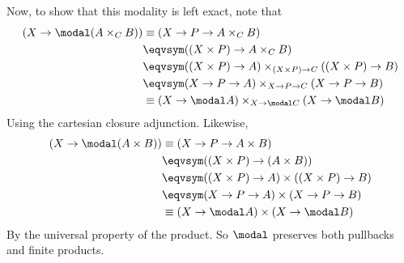 Now, to show that this modality is left exact, note that
\begin{align*}
 (X \to \modal(A \times_{C} B))
 &\equiv
 (X \to P \to A \times_{C} B)
 \\&\eqvsym
 ((X \times P) \to A \times_{C} B)
 \\&\eqvsym
 ((X \times P) \to A) \times_{(X \times P) \to C} ((X \times P) \to B)
 \\&\eqvsym
 (X \to P \to A) \times_{X \to P \to C} (X \to P \to B)
 \\&\equiv
 (X \to \modal A) \times_{X \to \modal C} (X \to \modal B)
\end{align*}
Using the cartesian closure adjunction.  Likewise,
\begin{align*}
  (X \to \modal(A \times B))
  &\equiv
  (X \to P \to A \times B)
  \\&\eqvsym
  ((X \times P) \to (A \times B))
  \\&\eqvsym
  ((X \times P) \to A)
  \times
  ((X \times P) \to B)
  \\&\eqvsym
  (X \to P \to A)
  \times
  (X \to P \to B)
  \\&\equiv
  (X \to \modal A)
  \times
  (X \to \modal B)
\end{align*}
By the universal property of the product.  So $\modal$ preserves both pullbacks
and finite products.


